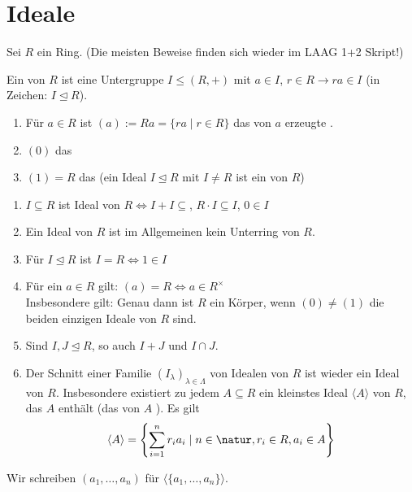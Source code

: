 \section{Ideale}

Sei $R$ ein Ring. (Die meisten Beweise finden sich wieder im LAAG 1+2 Skript!)

\begin{definition}[Ideal]
	Ein  von $R$ ist eine Untergruppe $I \leq (R,+)$ mit $a \in I$, $r \in R \to ra \in I$ (in Zeichen: $I \unlhd R$).
\end{definition}

\begin{example}
	\begin{enumerate}[label=(\alph*)]
		\item Für $a \in R$ ist $(a) := Ra = \{ra \mid r \in R\}$ das von $a$ erzeugte .
		\item $(0)$ das 
		\item $(1) = R$ das  (ein Ideal $I \unlhd R$ mit $I \neq R$ ist ein   von $R$) 
	\end{enumerate}
\end{example}

\begin{remark}
	\begin{enumerate}[label=(\alph*)]
		\item $I \subseteq R$ ist Ideal von $R \Leftrightarrow I + I \subseteq$, $R \cdot I \subseteq I$, $0 \in I$
		\item Ein Ideal von $R$ ist im Allgemeinen kein Unterring von $R$.
		\item Für $I \unlhd R$ ist $I = R \Leftrightarrow 1 \in I$
		\item Für ein $a \in R$ gilt: $(a) = R \Leftrightarrow a \in R^{\times}$\\
		Insbesondere gilt: Genau dann ist $R$ ein Körper, wenn $(0) \neq (1)$ die beiden einzigen Ideale von $R$ sind.
		\item Sind $I,J \unlhd R$, so auch $I + J$ und $I \cap J$.
		\item Der Schnitt einer Familie $(I_\lambda)_{\lambda \in \Lambda}$ von Idealen von $R$ ist wieder ein Ideal von $R$. Insbesondere existiert zu jedem $A \subseteq R$ ein kleinstes Ideal $\langle A \rangle$ von $R$, das $A$ enthält (das von $A$ ). Es gilt
		\begin{align}
			\langle A \rangle = \left\{ \sum_{i=1}^{n} r_i a_i \mid n \in \natur, r_i \in R, a_i \in A\right\} \notag
		\end{align}
	\end{enumerate}
	Wir schreiben $(a_1, \dots, a_n)$ für $\langle\{ a_1, \dots, a_n \}\rangle$.
\end{remark}


